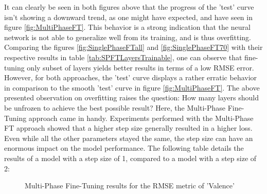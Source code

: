 It can clearly be seen in both figures above that the progress of the 'test' curve isn't showing a downward trend, as one might have expected, and have seen in figure \ref{fig:MultiPhaseFT}. This behavior is a strong indication that the neural network is not able to generalize well from its training, and is thus overfitting.
\newline\newline
Comparing the figures \ref{fig:SinglePhaseFTall} and \ref{fig:SinglePhaseFT70} with their respective results in table \ref{tab:SPFTLayersTrainable}, one can observe that fine-tuning only subset of layers yields better results in terms of a low RMSE error. However, for both approaches, the 'test' curve displays a rather erratic behavior in comparison to the smooth 'test' curve in figure \ref{fig:MultiPhaseFT}. 
\newline\newline
The above presented observation on overfitting raises the question: How many layers should be unfrozen to achieve the best possible result? \newline
Here, the Multi-Phase Fine-Tuning approach came in handy. Experiments performed with the Multi-Phase FT approach showed that a higher step size generally resulted in a higher loss. Even while all the other parameters stayed the same, the step size can have an enormous impact on the model performance. The following table details the results of a model with a step size of 1, compared to a model with a step size of 2:

\begin{figure}[H]
  \centering
  \hfill
  \caption{Multi-Phase Fine-Tuning results for the RMSE metric of 'Valence'}
\end{figure}

